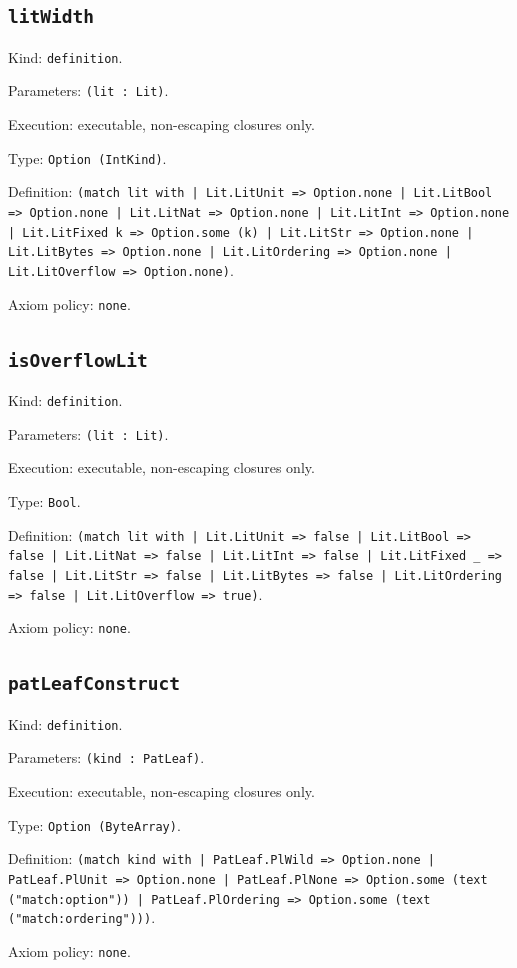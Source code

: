 \documentclass[11pt]{article}
\begin{document}
\subsection*{\texttt{litWidth}}
\noindent Kind: \texttt{definition}.\par
\noindent Parameters: \texttt{(lit : Lit)}.\par
\noindent Execution: executable, non-escaping closures only.\par
\noindent Type: \texttt{Option (IntKind)}.\par
\noindent Definition: \texttt{(match lit with | Lit.LitUnit => Option.none | Lit.LitBool => Option.none | Lit.LitNat => Option.none | Lit.LitInt => Option.none | Lit.LitFixed k => Option.some (k) | Lit.LitStr => Option.none | Lit.LitBytes => Option.none | Lit.LitOrdering => Option.none | Lit.LitOverflow => Option.none)}.\par
\noindent Axiom policy: \texttt{none}.\par
\subsection*{\texttt{isOverflowLit}}
\noindent Kind: \texttt{definition}.\par
\noindent Parameters: \texttt{(lit : Lit)}.\par
\noindent Execution: executable, non-escaping closures only.\par
\noindent Type: \texttt{Bool}.\par
\noindent Definition: \texttt{(match lit with | Lit.LitUnit => false | Lit.LitBool => false | Lit.LitNat => false | Lit.LitInt => false | Lit.LitFixed \_ => false | Lit.LitStr => false | Lit.LitBytes => false | Lit.LitOrdering => false | Lit.LitOverflow => true)}.\par
\noindent Axiom policy: \texttt{none}.\par
\subsection*{\texttt{patLeafConstruct}}
\noindent Kind: \texttt{definition}.\par
\noindent Parameters: \texttt{(kind : PatLeaf)}.\par
\noindent Execution: executable, non-escaping closures only.\par
\noindent Type: \texttt{Option (ByteArray)}.\par
\noindent Definition: \texttt{(match kind with | PatLeaf.PlWild => Option.none | PatLeaf.PlUnit => Option.none | PatLeaf.PlNone => Option.some (text ("match:option")) | PatLeaf.PlOrdering => Option.some (text ("match:ordering")))}.\par
\noindent Axiom policy: \texttt{none}.\par
\end{document}
